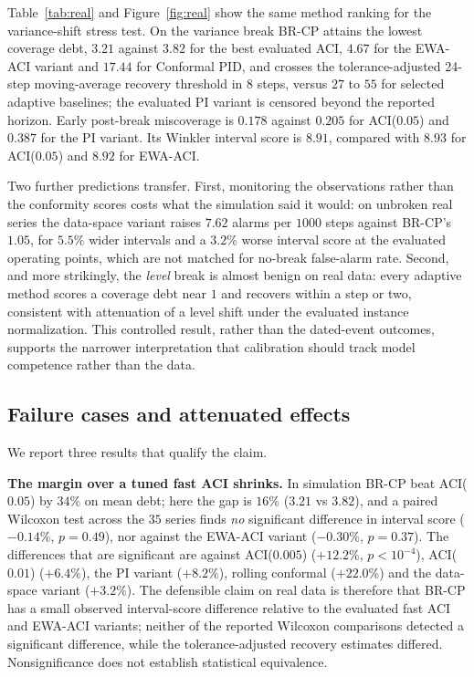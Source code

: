 \documentclass[10pt]{article}
\newcommand{\brcp}{\textsc{BR-CP}}
\begin{document}
Table~\ref{tab:real} and Figure~\ref{fig:real} show the same method ranking for the variance-shift stress test. On the variance break \brcp{} attains the lowest coverage debt,
$3.21$ against $3.82$ for the best evaluated ACI, $4.67$ for the EWA-ACI variant and $17.44$ for
Conformal PID, and crosses the tolerance-adjusted 24-step moving-average recovery threshold in $8$ steps, versus $27$ to $55$ for selected adaptive baselines; the evaluated PI variant is censored beyond the reported horizon.
Early post-break miscoverage is $0.178$ against $0.205$ for ACI($0.05$) and
$0.387$ for the PI variant. Its Winkler interval score is $8.91$, compared with $8.93$ for ACI($0.05$) and $8.92$ for EWA-ACI.

Two further predictions transfer. First, monitoring the observations rather
than the conformity scores costs what the simulation said it would: on unbroken
real series the data-space variant raises $7.62$ alarms per $1000$ steps
against \brcp{}'s $1.05$, for $5.5\%$ wider intervals and a $3.2\%$ worse
interval score at the evaluated operating points, which are not matched for no-break false-alarm rate. Second, and more strikingly, the \emph{level} break is almost
benign on real data: every adaptive method scores a coverage debt near $1$ and
recovers within a step or two, consistent with attenuation of a level shift under the evaluated instance normalization. This controlled result, rather than the dated-event outcomes, supports the narrower interpretation that calibration should track model competence
rather than the data.

\subsection{Failure cases and attenuated effects}

We report three results that qualify the claim.

\textbf{The margin over a tuned fast ACI shrinks.} In simulation \brcp{} beat
ACI($0.05$) by $34\%$ on mean debt; here the gap is $16\%$ ($3.21$ vs $3.82$),
and a paired Wilcoxon test across the $35$ series finds \emph{no} significant
difference in interval score ($-0.14\%$, $p=0.49$), nor against the EWA-ACI variant
($-0.30\%$, $p=0.37$). The differences that are significant are against
ACI($0.005$) ($+12.2\%$, $p<10^{-4}$), ACI($0.01$) ($+6.4\%$), the PI variant
($+8.2\%$), rolling conformal ($+22.0\%$) and the data-space variant
($+3.2\%$). The defensible claim on real data is therefore that \brcp{}
has a small observed interval-score difference relative to the evaluated fast ACI and EWA-ACI variants; neither of the reported Wilcoxon comparisons detected a significant difference, while the tolerance-adjusted recovery estimates differed. Nonsignificance does not establish statistical equivalence.
\end{document}
